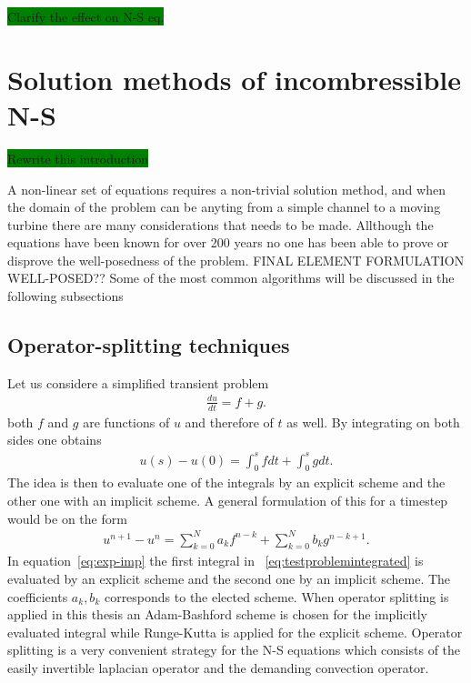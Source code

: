 \colorbox{green}{Clarify the effect on N-S eq.}

\section{Solution methods of incombressible N-S}
\colorbox{green}{Rewrite this introduction}


A non-linear set of equations requires a non-trivial solution method, and when the domain of the problem can be anyting from a simple channel 
to a moving turbine there are many considerations that needs to be made. Allthough the equations have been known for over 200 years no one 
has been able to prove or disprove the well-posedness of the problem. FINAL ELEMENT FORMULATION WELL-POSED?? Some of the most common algorithms 
will be discussed in the following subsections

\subsection{Operator-splitting techniques }
Let us considere a simplified transient problem 
\begin{align}
    \frac{du}{dt} = f + g.
    \label{eq:testproblem}
\end{align}
both $f$ and $g$ are functions of $u$ and therefore of $t$ as well. By integrating on both sides one obtains
\begin{align}
    u(s) - u(0) = \int_0^s f dt + \int_0^s g dt.
    \label{eq:testproblemintegrated}
\end{align}
The idea is then to evaluate one of the integrals by an explicit scheme and the other one with an implicit scheme.
A general formulation of this for a timestep would be on the form 
\begin{align}
    u^{n+1}-u^{n} = \sum_{k = 0}^{N} a_k f^{n-k}+\sum_{k = 0}^{N} b_k g^{n-k+1}.
    \label{eq:exp-imp}
\end{align}
In equation~\ref{eq:exp-imp} the first integral in ~\ref{eq:testproblemintegrated} is evaluated by 
an explicit scheme and the second one by an implicit scheme. The coefficients $a_k,b_k$ corresponds to 
the elected scheme. When operator splitting is applied in this thesis an Adam-Bashford scheme is 
chosen for the implicitly evaluated integral while Runge-Kutta is applied for the explicit scheme. 
Operator splitting is a very convenient strategy for 
the N-S equations which consists of the easily invertible laplacian operator 
and the demanding convection operator. 

